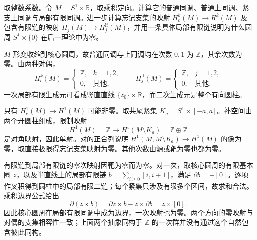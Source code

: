 \begin{exercise}\label{g2:ex:cylinder-support-duality}
	取整数系数。令 \(M=S^1\times\mathbb R\)，取乘积定向。计算它的普通同调、普通上同调、紧支上同调与局部有限同调。进一步计算忘记支集的映射 \(H_c^k(M)\to H^k(M)\) 及包含有限链的映射 \(H_j(M)\to H_j^{\mathrm{lf}}(M)\)，并用一条具体局部有限链说明为什么圆周 \(S^1\times\{0\}\) 在后一理论中为零。
\end{exercise}
\begin{solution}
	\(M\) 形变收缩到核心圆周，故普通同调与上同调均在次数 \(0,1\) 为 \(\mathbb Z\)，其余次数为零。由两种对偶，
	\[
		H_c^k(M)=\begin{cases}\mathbb Z,&k=1,2,\\0,&\text{其他},\end{cases}
		\qquad H_j^{\mathrm{lf}}(M)=\begin{cases}\mathbb Z,&j=1,2,\\0,&\text{其他}.\end{cases}
	\]
	一次局部有限生成元可看成竖直直线 \(\{z_0\}\times\mathbb R\)，而二次生成元是整个有向圆柱。

	只有 \(H_c^1(M)\to H^1(M)\) 可能非零。取共尾紧集 \(K_a=S^1\times[-a,a]\)。补空间由两个开圆柱组成，限制映射
	\[
		H^1(M)=\mathbb Z\longrightarrow H^1(M\setminus K_a)=\mathbb Z\oplus\mathbb Z
	\]
	是对角映射，因此单射。对的正合列说明 \(H^1(M,M\setminus K_a)\to H^1(M)\) 的像为零，取直接极限得忘记支集映射为零。其他次数由源或靶为零也都为零。

	有限链到局部有限链的零次映射因靶为零而为零。对一次，取核心圆周的有限基本圈 \(z\)，以及半直线上的局部有限链 \(b=\sum_{i\ge0}[i,i+1]\)，满足 \(\partial b=-[0]\)。逐项作叉积得到圆柱中的局部有限二链；每个紧集只涉及有限多个区间，故求和合法。乘积边界公式给出
	\[
		\partial(z\times b)=\partial z\times b- z\times\partial b=z\times[0].
	\]
	因此核心圆周在局部有限同调中成为边界，一次映射也为零。两个方向的零映射与对偶的支集相容性一致；上面两个抽象同构于 \(\mathbb Z\) 的一次群并没有通过这个自然包含彼此同构。
\end{solution}

